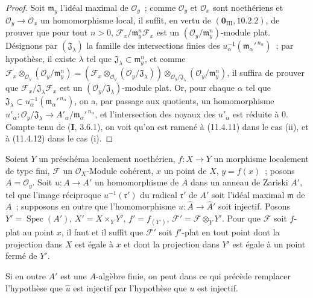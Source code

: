 \begin{proof}
Soit $\mathfrak m_y$ l'idéal maximal de $\mathcal O_y$~; comme $\mathcal O_y$
et $\mathcal O_x$ sont noethériens et $\mathcal O_y\to\mathcal O_x$ un
homomorphisme local, il suffit, en vertu de
$(\mathbf 0_{\mathrm{III}},10.2.2)$, de prouver que pour tout $n>0$,
$\mathcal F_x/\mathfrak m_y^n\mathcal F_x$ est un
$(\mathcal O_y/\mathfrak m_y^n)$-module plat. Désignons par
$(\mathfrak J_\lambda)$ la famille des intersections finies des
$u_\alpha^{-1}(\mathfrak m_\alpha'^{\,n_\alpha})$~; par hypothèse, il existe
$\lambda$ tel que $\mathfrak J_\lambda\subset\mathfrak m_y^n$, et comme
$\mathcal F_x\otimes_{\mathcal O_y}(\mathcal O_y/\mathfrak m_y^n)=(\mathcal F_x\otimes_{\mathcal O_y}(\mathcal O_y/\mathfrak J_\lambda))\otimes_{\mathcal O_y/\mathfrak J_\lambda}(\mathcal O_y/\mathfrak m_y^n)$,
il suffira de prouver que $\mathcal F_x/\mathfrak J_\lambda\mathcal F_x$ est un
$(\mathcal O_y/\mathfrak J_\lambda)$-module plat. Or, pour chaque $\alpha$ tel
que $\mathfrak J_\lambda\subset u_\alpha^{-1}(\mathfrak m_\alpha'^{\,n_\alpha})$,
on a, par passage aux quotients, un homomorphisme
$u'_\alpha:\mathcal O_y/\mathfrak J_\lambda\to
A'_\alpha/\mathfrak m_\alpha'^{\,n_\alpha}$, et l'intersection des noyaux des
$u'_\alpha$ est réduite à $0$. Compte tenu de (\textbf I, 3.6.1), on voit qu'on
est ramené à (11.4.11) dans le cas (ii), et à (11.4.12) dans le cas (i).
\end{proof}

\begin{corollary}[11.5.2]
\label{IV.11.5.2-fr}
Soient $Y$ un préschéma localement noethérien, $f:X\to Y$ un morphisme
localement de type fini, $\mathcal F$ un $\mathcal O_X$-Module cohérent, $x$ un
point de $X$, $y=f(x)$~; posons $A=\mathcal O_y$. Soit $u:A\to A'$ un
homomorphisme de $A$ dans un anneau de Zariski $A'$, tel que l'image réciproque
$u^{-1}(\mathfrak r')$ du radical $\mathfrak r'$ de $A'$ soit l'idéal maximal
$\mathfrak m$ de $A$~; supposons en outre que l'homomorphisme
$\widehat u:\widehat A\to\widehat{A}'$ soit injectif. Posons
$Y'=\operatorname{Spec}(A')$, $X'=X\times_Y Y'$, $f'=f_{(Y')}$,
$\mathcal F'=\mathcal F\otimes_Y Y'$. Pour que $\mathcal F$ soit $f$-plat au
point $x$, il faut et il suffit que $\mathcal F'$ soit $f'$-plat en tout point
dont la projection dans $X$ est égale à $x$ et dont la projection dans $Y'$ est
égale à un point fermé de $Y'$.

Si en outre $A'$ est une $A$-algèbre finie, on peut dans ce qui précède
remplacer l'hypothèse que $\widehat u$ est injectif par l'hypothèse que $u$ est
injectif.
\end{corollary}

